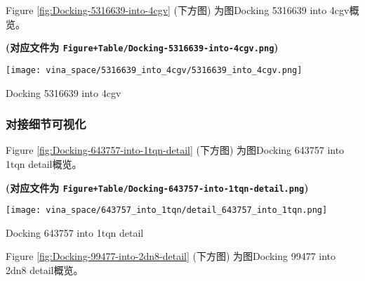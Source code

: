\documentclass[
]{article}
\begin{document}
Figure \ref{fig:Docking-5316639-into-4cgv} (下方图) 为图Docking 5316639 into 4cgv概览。

\textbf{(对应文件为 \texttt{Figure+Table/Docking-5316639-into-4cgv.png})}

\def\@captype{figure}
\begin{center}
\texttt{[image: vina\_space/5316639\_into\_4cgv/5316639\_into\_4cgv.png]}
\caption{Docking 5316639 into 4cgv}\label{fig:Docking-5316639-into-4cgv}
\end{center}

\begin{center}\vspace{1.5cm}\end{center}

\hypertarget{ux5bf9ux63a5ux7ec6ux8282ux53efux89c6ux5316}{%
\subsubsection{对接细节可视化}\label{ux5bf9ux63a5ux7ec6ux8282ux53efux89c6ux5316}}

\begin{center}\vspace{1.5cm}\end{center}

Figure \ref{fig:Docking-643757-into-1tqn-detail} (下方图) 为图Docking 643757 into 1tqn detail概览。

\textbf{(对应文件为 \texttt{Figure+Table/Docking-643757-into-1tqn-detail.png})}

\def\@captype{figure}
\begin{center}
\texttt{[image: vina\_space/643757\_into\_1tqn/detail\_643757\_into\_1tqn.png]}
\caption{Docking 643757 into 1tqn detail}\label{fig:Docking-643757-into-1tqn-detail}
\end{center}

\begin{center}\vspace{1.5cm}\end{center}

\begin{center}\vspace{1.5cm}\end{center}

Figure \ref{fig:Docking-99477-into-2dn8-detail} (下方图) 为图Docking 99477 into 2dn8 detail概览。
\end{document}
